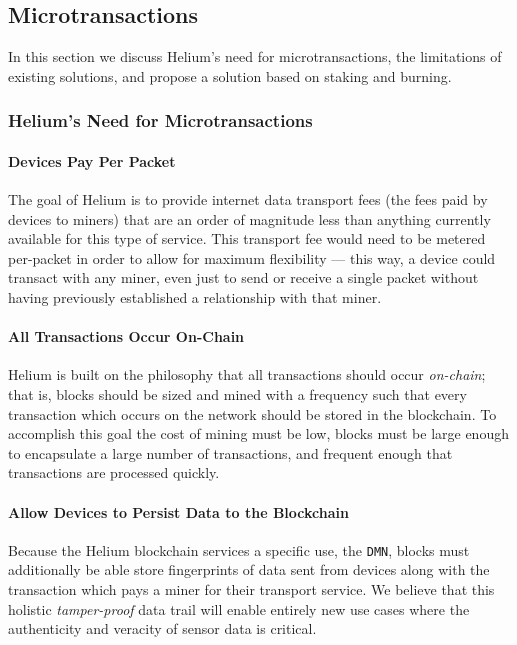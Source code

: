 \documentclass[UTF8, 10pt, nonatbib, nocopyrightspace, reprint]{sigplanconf}
\begin{document}
\subsection{Microtransactions} \label{microtransactions}

In this section we discuss Helium's need for microtransactions, the limitations of existing solutions, and propose a solution based on staking and burning.

\subsubsection{Helium's Need for Microtransactions}

\paragraph{Devices Pay Per Packet}
The goal of Helium is to provide internet data transport fees (the fees paid by devices to miners) that are an order of magnitude less than anything currently available for this type of service. This transport fee would need to be metered per-packet in order to allow for maximum flexibility --- this way, a device could transact with any miner, even just to send or receive a single packet without having previously established a relationship with that miner.

\paragraph{All Transactions Occur On-Chain}
Helium is built on the philosophy that all transactions should occur \emph{on-chain}; that is, blocks should be sized and mined with a frequency such that every transaction which occurs on the network should be stored in the blockchain.  To accomplish this goal the cost of mining must be low, blocks must be large enough to encapsulate a large number of transactions, and frequent enough that transactions are processed quickly.

\paragraph{Allow Devices to Persist Data to the Blockchain}
Because the Helium blockchain services a specific use, the \verb|DMN|, blocks must additionally be able store fingerprints of data sent from devices along with the transaction which pays a miner for their transport service.  We believe that this holistic \emph{tamper-proof} data trail will enable entirely new use cases where the authenticity and veracity of sensor data is critical.
\end{document}
